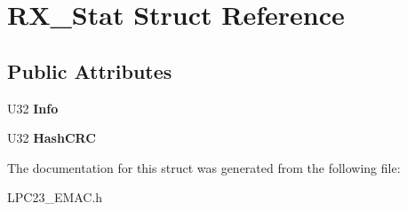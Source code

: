 \hypertarget{struct_r_x___stat}{
\section{RX\_\-Stat Struct Reference}
\label{struct_r_x___stat}
}
\subsection*{Public Attributes}
\begin{DoxyCompactItemize}
\item 
\hypertarget{struct_r_x___stat_a023f003e7b00333c16dc98e46b5c3da2}{
U32 {\bfseries Info}}
\label{struct_r_x___stat_a023f003e7b00333c16dc98e46b5c3da2}

\item 
\hypertarget{struct_r_x___stat_a531b87f691c7c773c89e1020f93f9c91}{
U32 {\bfseries HashCRC}}
\label{struct_r_x___stat_a531b87f691c7c773c89e1020f93f9c91}

\end{DoxyCompactItemize}


The documentation for this struct was generated from the following file:\begin{DoxyCompactItemize}
\item 
LPC23\_\-EMAC.h\end{DoxyCompactItemize}
